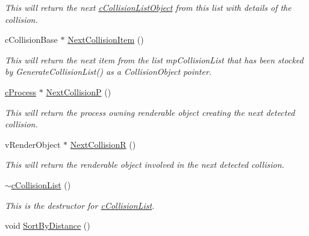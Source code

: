 \begin{DoxyCompactItemize}
\begin{DoxyCompactList}\small\item\em This will return the next \hyperlink{classc_collision_list_object}{cCollisionListObject} from this list with details of the collision. \end{DoxyCompactList}\item 
\hypertarget{classc_collision_list_a41aff559f22b6d8da47f9028d272172e}{
cCollisionBase $\ast$ \hyperlink{classc_collision_list_a41aff559f22b6d8da47f9028d272172e}{NextCollisionItem} ()}
\label{classc_collision_list_a41aff559f22b6d8da47f9028d272172e}

\begin{DoxyCompactList}\small\item\em This will return the next item from the list mpCollisionList that has been stocked by GenerateCollisionList() as a CollisionObject pointer. \end{DoxyCompactList}\item 
\hypertarget{classc_collision_list_ac641346bbc7e3d3b84880ae03b0496c5}{
\hyperlink{classc_process}{cProcess} $\ast$ \hyperlink{classc_collision_list_ac641346bbc7e3d3b84880ae03b0496c5}{NextCollisionP} ()}
\label{classc_collision_list_ac641346bbc7e3d3b84880ae03b0496c5}

\begin{DoxyCompactList}\small\item\em This will return the process owning renderable object creating the next detected collision. \end{DoxyCompactList}\item 
\hypertarget{classc_collision_list_a87c8ee3baa85ff002030c83bd1784192}{
vRenderObject $\ast$ \hyperlink{classc_collision_list_a87c8ee3baa85ff002030c83bd1784192}{NextCollisionR} ()}
\label{classc_collision_list_a87c8ee3baa85ff002030c83bd1784192}

\begin{DoxyCompactList}\small\item\em This will return the renderable object involved in the next detected collision. \end{DoxyCompactList}\item 
\hypertarget{classc_collision_list_a628ed6510cd89c192a402be0a64ea111}{
\hyperlink{classc_collision_list_a628ed6510cd89c192a402be0a64ea111}{$\sim$cCollisionList} ()}
\label{classc_collision_list_a628ed6510cd89c192a402be0a64ea111}

\begin{DoxyCompactList}\small\item\em This is the destructor for \hyperlink{classc_collision_list}{cCollisionList}. \end{DoxyCompactList}\item 
\hypertarget{classc_collision_list_ae279c0239ead11e2d6c3647495347cc4}{
void \hyperlink{classc_collision_list_ae279c0239ead11e2d6c3647495347cc4}{SortByDistance} ()}
\label{classc_collision_list_ae279c0239ead11e2d6c3647495347cc4}


\end{DoxyCompactItemize}

